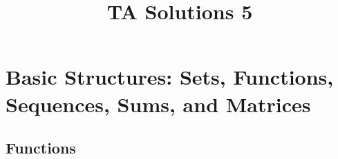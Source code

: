 \documentclass[11pt,a4paper,multicol]{article}
\newcommand{\chapter}[2]{%
\setcounter{section}{#1}%
\addtocounter{section}{-1}%
\section{#2}%
}
\newcommand{\subchapter}[2]{%
\setcounter{subsection}{#1}%
\addtocounter{subsection}{-1}%
\subsection{#2}%
}
\begin{document}
\title{TA Solutions 5}
\date{}
\author{}
\maketitle

\chapter{2}{Basic Structures: Sets, Functions, Sequences, Sums, and Matrices}
	\subchapter{3}{Functions}
		
\end{document}
